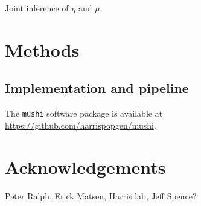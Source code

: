 \documentclass[11pt]{article}
\begin{document}
Joint inference of $\eta$ and $\mu$.


\section*{Methods}\label{sec:methods}

\subsection*{Implementation and pipeline}\label{sec:methods:tool}

The \texttt{mushi} software package is available at \url{https://github.com/harrispopgen/mushi}.

\section*{Acknowledgements}\label{sec:ack}

Peter Ralph, Erick Matsen, Harris lab, Jeff Spence?





\appendix

\end{document}
